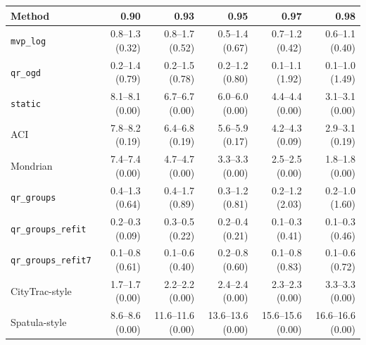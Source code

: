 \setlength{\tabcolsep}{3.4pt}
\begin{tabular}{@{}lrrrrr@{}}
\toprule
Method & 0.90 & 0.93 & 0.95 & 0.97 & 0.98 \\
\midrule
\texttt{mvp\_log} & 0.8--1.3 (0.32) & 0.8--1.7 (0.52) & 0.5--1.4 (0.67) & 0.7--1.2 (0.42) & 0.6--1.1 (0.40) \\
\texttt{qr\_ogd} & 0.2--1.4 (0.79) & 0.2--1.5 (0.78) & 0.2--1.2 (0.80) & 0.1--1.1 (1.92) & 0.1--1.0 (1.49) \\
\texttt{static} & 8.1--8.1 (0.00) & 6.7--6.7 (0.00) & 6.0--6.0 (0.00) & 4.4--4.4 (0.00) & 3.1--3.1 (0.00) \\
ACI & 7.8--8.2 (0.19) & 6.4--6.8 (0.19) & 5.6--5.9 (0.17) & 4.2--4.3 (0.09) & 2.9--3.1 (0.19) \\
Mondrian & 7.4--7.4 (0.00) & 4.7--4.7 (0.00) & 3.3--3.3 (0.00) & 2.5--2.5 (0.00) & 1.8--1.8 (0.00) \\
\texttt{qr\_groups} & 0.4--1.3 (0.64) & 0.4--1.7 (0.89) & 0.3--1.2 (0.81) & 0.2--1.2 (2.03) & 0.2--1.0 (1.60) \\
\texttt{qr\_groups\_refit} & 0.2--0.3 (0.09) & 0.3--0.5 (0.22) & 0.2--0.4 (0.21) & 0.1--0.3 (0.41) & 0.1--0.3 (0.46) \\
\texttt{qr\_groups\_refit7} & 0.1--0.8 (0.61) & 0.1--0.6 (0.40) & 0.2--0.8 (0.60) & 0.1--0.8 (0.83) & 0.1--0.6 (0.72) \\
CityTrac-style & 1.7--1.7 (0.00) & 2.2--2.2 (0.00) & 2.4--2.4 (0.00) & 2.3--2.3 (0.00) & 3.3--3.3 (0.00) \\
Spatula-style & 8.6--8.6 (0.00) & 11.6--11.6 (0.00) & 13.6--13.6 (0.00) & 15.6--15.6 (0.00) & 16.6--16.6 (0.00) \\
\bottomrule
\end{tabular}
